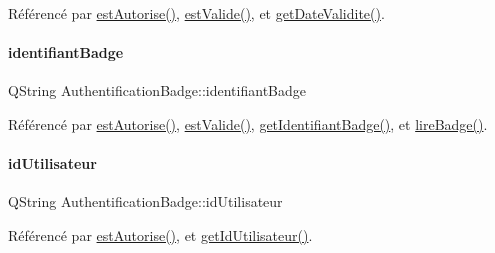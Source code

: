 Référencé par \hyperlink{class_authentification_badge_aceb9c5a09dddbff73cd02973913c79c1}{est\+Autorise()}, \hyperlink{class_authentification_badge_af320bf9cdbb285c48cd323e0ec3ef529}{est\+Valide()}, et \hyperlink{class_authentification_badge_a76f7b9a424aeec947813c6858ff945a3}{get\+Date\+Validite()}.

\mbox{\label{class_authentification_badge_a7120366168cbe21efd991a978922eb20}} 
\paragraph{\texorpdfstring{identifiant\+Badge}{identifiantBadge}}
{\footnotesize\ttfamily Q\+String Authentification\+Badge\+::identifiant\+Badge\hspace{0.3cm}{\ttfamily [private]}}



Référencé par \hyperlink{class_authentification_badge_aceb9c5a09dddbff73cd02973913c79c1}{est\+Autorise()}, \hyperlink{class_authentification_badge_af320bf9cdbb285c48cd323e0ec3ef529}{est\+Valide()}, \hyperlink{class_authentification_badge_a4bb0edf5a4483d9125bc53b1a7e24b7b}{get\+Identifiant\+Badge()}, et \hyperlink{class_authentification_badge_a77488a375465873bfe6ab62f53abea6d}{lire\+Badge()}.

\mbox{\label{class_authentification_badge_ab26f8f696e807cbffd2c50cbad465b89}} 
\paragraph{\texorpdfstring{id\+Utilisateur}{idUtilisateur}}
{\footnotesize\ttfamily Q\+String Authentification\+Badge\+::id\+Utilisateur\hspace{0.3cm}{\ttfamily [private]}}



Référencé par \hyperlink{class_authentification_badge_aceb9c5a09dddbff73cd02973913c79c1}{est\+Autorise()}, et \hyperlink{class_authentification_badge_ae8c755b184c20626d4362d5e4739dfe1}{get\+Id\+Utilisateur()}.


